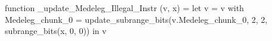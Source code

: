 function _update_Medeleg_Illegal_Instr (v, x) = let v = { v with Medeleg_chunk_0 = update_subrange_bits(v.Medeleg_chunk_0, 2, 2, subrange_bits(x, 0, 0)) } in
  v
